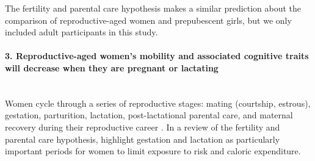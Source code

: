 


The fertility and parental care hypothesis makes a similar prediction about the comparison of reproductive-aged women and prepubescent girls, but we only included adult participants in this study.
  
\paragraph{3.  Reproductive-aged women's mobility and associated cognitive traits will decrease when they are pregnant or lactating}\mbox{}\\

Women cycle through a series of reproductive stages: mating (courtship, estrous), gestation, parturition, lactation, post-lactational parental care, and maternal recovery during their reproductive career \citep{gittleman1988energy}.  In a review of the fertility and parental care hypothesis, \citet{jones2003evolution} highlight gestation and lactation as particularly important periods for women to limit exposure to risk and caloric expenditure.  

